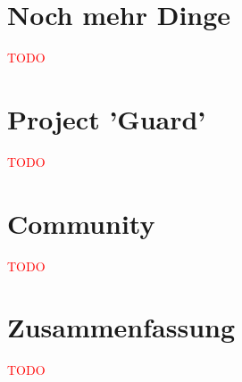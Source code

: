 \documentclass[11pt]{scrartcl}
\newcommand\todo[1]{\textcolor{red}{#1}}
\begin{document}
\section{Noch mehr Dinge}
\label{sec:dinge2}
\todo{TODO}





\section{Project 'Guard'}
\label{sec:guard}
\todo{TODO}





\section{Community}
\label{sec:community}
\todo{TODO}



\section{Zusammenfassung}
\label{sec:fazit}
\todo{TODO}



 
 
\end{document}
